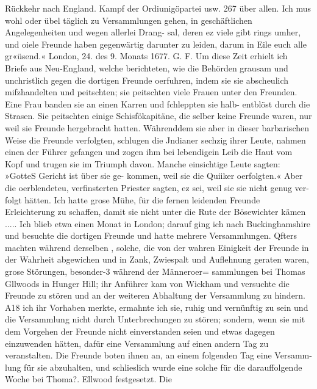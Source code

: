 Rückkehr nach England. Kampf der Ordiunigöpartei usw. 267
über allen. Ich mus wohl oder übel täglich zu Versammlungen
gehen, in geschäftlichen Angelegenheiten und wegen allerlei Drang-
sal, deren ez viele gibt rings umher, und oiele Freunde haben
gegenwärtig darunter zu leiden, darum in Eile euch alle gr«üsend.«
London, 24. des 9. Monats 1677. G. F.
Um diese Zeit erhielt ich Briefe aus Neu-England, welche
berichteten, wie die Behörden grausam und unchristlich gegen die
dortigen Freunde oerfuhren, indem sie sie abscheulich mifzhandelten
und peitschten; sie peitschten viele Frauen unter den Freunden.
Eine Frau banden sie an einen Karren und fchleppten sie halb-
entblöst durch die Strasen. Sie peitschten einige Schisfökapitäne,
die selber keine Freunde waren, nur weil sie Freunde hergebracht
hatten. Währenddem sie aber in dieser barbarischen Weise die
Freunde verfolgten, schlugen die Jndianer sechzig ihrer Leute,
nahmen einen der Führer gefangen und zogen ihm bei lebendigein
Leib die Haut vom Kopf und trugen sie im Triumph davon.
Manche einsichtige Leute sagten: »GotteS Gericht ist über sie ge-
kommen, weil sie die Quiiker oerfolgten.« Aber die oerblendeteu,
verfinsterten Priester sagten, ez sei, weil sie sie nicht genug ver-
folgt hätten. Ich hatte grose Mühe, für die fernen leidenden
Freunde Erleichterung zu schaffen, damit sie nicht unter die Rute
der Bösewichter kämen .....
Ich blieb etwa einen Monat in London; darauf ging ich
nach Buckinghamshire und besuchte die dortigen Freunde und
hatte mehrere Versammlungen. Qfters machten während derselben ,
solche, die von der wahren Einigkeit der Freunde in der Wahrheit
abgewichen und in Zank, Zwiespalt und Auflehnung geraten
waren, grose Störungen, besonder-3 während der Männeroer=
sammlungen bei Thomas Gllwoods in Hunger Hill; ihr Anführer
kam von Wickham und versuchte die Freunde zu stören und
an der weiteren Abhaltung der Versammlung zu hindern. A18
ich ihr Vorhaben merkte, ermahnte ich sie, ruhig und vernünftig
zu sein und die Versammlung nicht durch Unterbrechungen zu
stören; sondern, wenn sie mit dem Vorgehen der Freunde nicht
einverstanden seien und etwas dagegen einzuwenden hätten, dafür
eine Versammlung auf einen andern Tag zu veranstalten. Die
Freunde boten ihnen an, an einem folgenden Tag eine Versamm-
lung für sie abzuhalten, und schlieslich wurde eine solche für die
darauffolgende Woche bei Thoma?. Ellwood festgesetzt. Die


